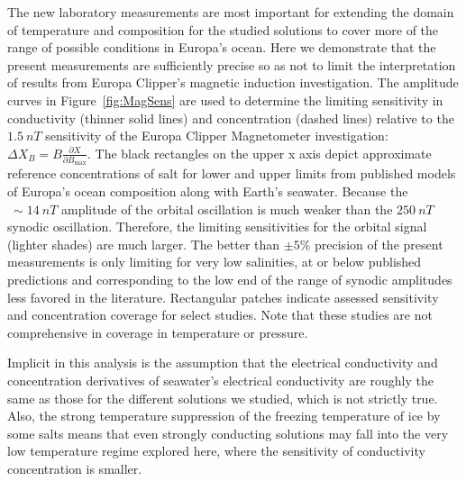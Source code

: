\documentclass[journal=aesccq,manuscript=article]{achemso}
\begin{document}
The new laboratory measurements are most important for extending the domain of temperature and composition for the studied solutions to cover more of the range of possible conditions in Europa's ocean. 
Here we demonstrate that the present measurements are sufficiently precise so as not to limit the interpretation of results from Europa Clipper's magnetic induction investigation. 
The amplitude curves in Figure~\ref{fig:MagSens} are used to determine the limiting sensitivity in conductivity (thinner solid lines) and concentration (dashed lines) relative to the $\SI{1.5}{nT}$ sensitivity of the Europa Clipper Magnetometer investigation\cite{kivelsonv2023europa}:$\Delta X_B = B\frac{\partial X}{\partial B_\mathrm{max}}$.
 The black rectangles on the upper x axis depict approximate reference concentrations of salt for lower\cite{zolotov2001composition} and upper\cite{kargel_europas_2000} limits from published models of Europa's ocean composition along with Earth's seawater.
Because the $~\sim \SI{14}{nT}$ amplitude of the orbital oscillation is much weaker than the $\SI{250}{nT}$ synodic oscillation\cite{kivelsonv2023europa}. 
Therefore, the limiting sensitivities for the orbital signal (lighter shades) are much larger. 
The better than $\pm5\%$ precision of the present measurements is only limiting for very low salinities, at or below published predictions and corresponding to the low end of the range of synodic amplitudes less favored in the literature. 
Rectangular patches indicate assessed sensitivity and concentration coverage for select studies\cite{McCleskey_2011,pan2021electrical}.
Note that these studies are not comprehensive in coverage in temperature or pressure.

Implicit in this analysis is the assumption that the electrical conductivity and concentration derivatives of seawater's electrical conductivity are roughly the same as those for the different solutions we studied, which is not strictly true. Also, the strong temperature suppression of the freezing temperature of ice by some salts means that even strongly conducting solutions may fall into the very low temperature regime explored here, where the sensitivity of conductivity concentration is smaller. 
\end{document}
